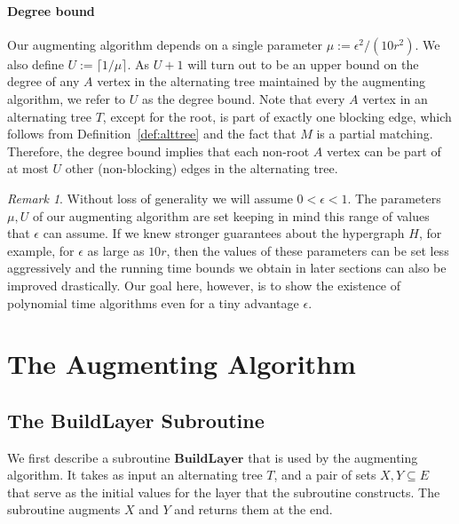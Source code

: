 \documentclass[11pt]{article}
\theoremstyle{definition}
\theoremstyle{remark}
\newtheorem{remark}[theorem]{Remark}
\begin{document}
\paragraph{Degree bound} Our augmenting algorithm
depends on a single parameter
$\mu:= \epsilon^2/(10r^2).$ We also define $U := \lceil 1/\mu \rceil.$ As
$U+1$ will turn out to be an upper bound on the degree of any $A$
vertex in the alternating tree maintained by the augmenting algorithm,
we refer to $U$ as the degree bound. Note that every $A$ vertex in an
alternating tree $T$, except for the root, is part of exactly one
blocking edge, which follows from Definition~\ref{def:alttree} and the
fact that $M$ is a partial matching. Therefore, the degree bound implies that each non-root
$A$ vertex can be part of at most $U$ other (non-blocking) edges in
the alternating tree.

\begin{remark}
  Without loss of generality we will assume $0 < \epsilon < 1$. The
  parameters $\mu, U$ of our augmenting algorithm are set keeping in
  mind this range of values that $\epsilon$ can assume. If we knew
  stronger guarantees about the hypergraph $H$, for example, for
  $\epsilon$ as large as $10r$, then the values of these parameters
  can be set less aggressively and the running time bounds we obtain
  in later sections can also be improved drastically. Our goal here,
  however, is to show the existence of polynomial time algorithms even
  for a tiny advantage $\epsilon$.
\end{remark}

\section{The Augmenting Algorithm}\label{section:augmenting}
\subsection{The BuildLayer Subroutine}\label{section:augmenting1}
We first describe a subroutine $\textbf{BuildLayer}$ that is used by the
augmenting algorithm. It takes as input an alternating tree $T$, and a
pair of sets $X, Y \subseteq E$ that serve as the initial values for
the layer that the subroutine constructs. The subroutine augments $X$
and $Y$ and returns them at the end.
\end{document}
